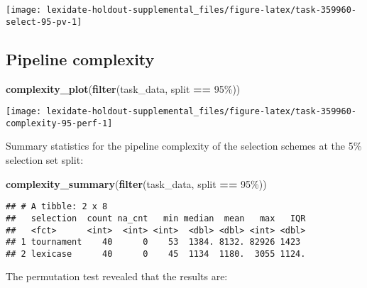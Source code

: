 \documentclass[
]{book}
\newenvironment{Shaded}{\begin{snugshade}}{\end{snugshade}}
\newcommand{\FunctionTok}[1]{\textcolor[rgb]{0.13,0.29,0.53}{\textbf{#1}}}
\newcommand{\NormalTok}[1]{#1}
\newcommand{\SpecialCharTok}[1]{\textcolor[rgb]{0.81,0.36,0.00}{\textbf{#1}}}
\newcommand{\StringTok}[1]{\textcolor[rgb]{0.31,0.60,0.02}{#1}}
\begin{document}
\texttt{[image: lexidate-holdout-supplemental\_files/figure-latex/task-359960-select-95-pv-1]}

\hypertarget{pipeline-complexity-47}{%
\subsection{Pipeline complexity}\label{pipeline-complexity-47}}

\begin{Shaded}
\begin{Highlighting}[]
\FunctionTok{complexity\_plot}\NormalTok{(}\FunctionTok{filter}\NormalTok{(task\_data, split }\SpecialCharTok{==} \StringTok{\textquotesingle{}95\%\textquotesingle{}}\NormalTok{))}
\end{Highlighting}
\end{Shaded}

\texttt{[image: lexidate-holdout-supplemental\_files/figure-latex/task-359960-complexity-95-perf-1]}

Summary statistics for the pipeline complexity of the selection schemes at the 5\% selection set split:

\begin{Shaded}
\begin{Highlighting}[]
\FunctionTok{complexity\_summary}\NormalTok{(}\FunctionTok{filter}\NormalTok{(task\_data, split }\SpecialCharTok{==} \StringTok{\textquotesingle{}95\%\textquotesingle{}}\NormalTok{))}
\end{Highlighting}
\end{Shaded}

\begin{verbatim}
## # A tibble: 2 x 8
##   selection  count na_cnt   min median  mean   max   IQR
##   <fct>      <int>  <int> <int>  <dbl> <dbl> <int> <dbl>
## 1 tournament    40      0    53  1384. 8132. 82926 1423 
## 2 lexicase      40      0    45  1134  1180.  3055 1124.
\end{verbatim}

The permutation test revealed that the results are:
\end{document}

